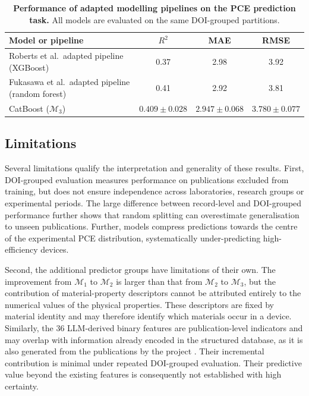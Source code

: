 \documentclass[3p]{elsarticle}
\begin{document}
\begin{table}[h]
    \centering
    \small
    \caption{\textbf{Performance of adapted modelling pipelines on the PCE prediction task.} All models are evaluated on the same DOI-grouped partitions.}
    \label{tab:adapted_pipeline_performance}
    \begin{tabular}{p{4.0cm}ccc}
        \toprule
        Model or pipeline & $R^2$ & MAE & RMSE \\
        \midrule
        Roberts et al.\ adapted pipeline (XGBoost)
        & 0.37
        & 2.98
        & 3.92 \\

        Fukasawa et al.\ adapted pipeline (random forest)
        & 0.41
        & 2.92
        & 3.81 \\

        CatBoost ($\mathcal{M}_3$)
        & $0.409\pm0.028$
        & $2.947\pm0.068$
        & $3.780\pm0.077$ \\
        \bottomrule
    \end{tabular}
\end{table}


\subsection{Limitations}
\label{sec:limitations}

Several limitations qualify the interpretation and generality of these results. First, DOI-grouped evaluation measures performance on publications excluded from training, but does not ensure independence across laboratories, research groups or experimental periods. The large difference between record-level and DOI-grouped performance further shows that random splitting can overestimate generalisation to unseen publications. Further, models compress predictions towards the centre of the experimental PCE distribution, systematically under-predicting high-efficiency devices.

Second, the additional predictor groups have limitations of their own. The improvement from $\mathcal{M}_1$ to $\mathcal{M}_2$ is larger than that from $\mathcal{M}_2$ to $\mathcal{M}_3$, but the contribution of material-property descriptors cannot be attributed entirely to the numerical values of the physical properties. These descriptors are fixed by material identity and may therefore identify which materials occur in a device. Similarly, the 36 LLM-derived binary features are publication-level indicators and may overlap with information already encoded in the structured database, as it is also generated from the publications by the project \cite{jacobsson2022open}. Their incremental contribution is minimal under repeated DOI-grouped evaluation. Their predictive value beyond the existing features is consequently not established with high certainty.
\end{document}
